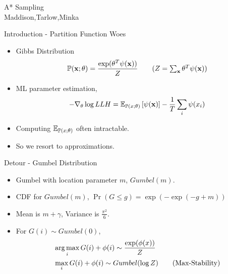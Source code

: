 \begin{frame}
  \begin{center}
    {\huge A* Sampling
    } \\
    Maddison,Tarlow,Minka
  \end{center}
\end{frame}

\begin{frame}{Introduction - Partition Function Woes}
  \begin{itemize}
  \item Gibbs Distribution
    \begin{align*}
      \Pr(\x;\theta) =\frac{\exp(\theta^T\psi(\x))}{Z} \tag{$Z=\sum_{\x} \theta^T\psi(\x)$}
    \end{align*}
  \item ML parameter estimation,
    \begin{align*}
      - \nabla_\theta \log LLH = \operatorname{\mathbb{E}}_{\mathbb{P}(x;\theta)}\left[\psi(\operatorname{\mathbf{x}})\right] - \frac{1}{T} \sum_i\psi(x_i)
    \end{align*}
  \item   Computing $\operatorname{\mathbb{E}}_{\mathbb{P}(x;\theta)}$ often intractable.
  \item So we resort to approximations. %
  \end{itemize}
\end{frame}

\begin{frame}{Detour - Gumbel Distribution}
  \begin{itemize}
    \item Gumbel with location parameter $m$, $Gumbel(m)$.
    \item CDF for $Gumbel(m)$, $\Pr(G\le g) = \exp(-\exp(-g+m))$ \\
    \item Mean is $m+\gamma$, Variance is $\frac{\pi^2}{6}$.
    \item For $G(i) \sim Gumbel(0)$,
      \begin{align*}
        & \operatorname*{{arg\,max}}_i{G(i)+\phi(i)} \sim \frac{\exp(\phi(x))}{Z} \\
        & \max_i{G(i)+\phi(i)} \sim Gumbel(\log Z) \tag{Max-Stability}
      \end{align*}
  \end{itemize}
\end{frame}


